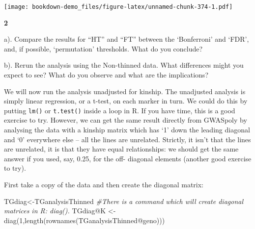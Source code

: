 \documentclass[
]{book}
\makeatletter
\newenvironment{Shaded}{\begin{snugshade}}{\end{snugshade}}
\newcommand{\AttributeTok}[1]{\textcolor[rgb]{0.77,0.63,0.00}{#1}}
\newcommand{\CommentTok}[1]{\textcolor[rgb]{0.56,0.35,0.01}{\textit{#1}}}
\newcommand{\DecValTok}[1]{\textcolor[rgb]{0.00,0.00,0.81}{#1}}
\newcommand{\FunctionTok}[1]{\textcolor[rgb]{0.00,0.00,0.00}{#1}}
\newcommand{\NormalTok}[1]{#1}
\newcommand{\OtherTok}[1]{\textcolor[rgb]{0.56,0.35,0.01}{#1}}
\newcommand{\SpecialCharTok}[1]{\textcolor[rgb]{0.00,0.00,0.00}{#1}}
\newenvironment{kframe}{%
\medskip{}
\setlength{\fboxsep}{.8em}
 \def\at@end@of@kframe{}%
 \ifinner\ifhmode%
  \def\at@end@of@kframe{\end{minipage}}%
  \begin{minipage}{\columnwidth}%
 \fi\fi%
 \def\FrameCommand##1{\hskip\@totalleftmargin \hskip-\fboxsep
 \colorbox{shadecolor}{##1}\hskip-\fboxsep
     \hskip-\linewidth \hskip-\@totalleftmargin \hskip\columnwidth}%
 \MakeFramed {\advance\hsize-\width
   \@totalleftmargin\z@ \linewidth\hsize
   \@setminipage}}%
 {\par\unskip\endMakeFramed%
 \at@end@of@kframe}
\newenvironment{rmdblock}[1]
  {
  \begin{itemize}
  \renewcommand{\labelitemi}{
    \raisebox{-.7\height}[0pt][0pt]{
      {\setkeys{Gin}{width=3em,keepaspectratio}\texttt{[image: images/\#1]}}
    }
  }
  \setlength{\fboxsep}{1em}
  \begin{kframe}
  \item
  }
  {
  \end{kframe}
  \end{itemize}
  }
\newenvironment{rmdquiz}
  {\begin{rmdblock}{quiz}}
  {\end{rmdblock}}
\makeatother
\begin{document}
\begin{Shaded}
\end{Shaded}

\texttt{[image: bookdown-demo\_files/figure-latex/unnamed-chunk-374-1.pdf]}

\begin{rmdquiz}
\textbf{2}

a). Compare the results for ``HT'' and ``FT'' between the `Bonferroni' and `FDR', and, if possible, `permutation' thresholds. What do you conclude?

b). Rerun the analysis using the Non-thinned data. What differences might you expect to see? What do you observe and what are the implications?
\end{rmdquiz}

We will now run the analysis unadjusted for kinship. The unadjusted analysis is simply linear regression, or a t-test, on each marker in turn. We could do this by putting \texttt{lm()} or \texttt{t.test()} inside a loop in R. If you have time, this is a good exercise to try. However, we can get the same result directly from GWASpoly by analysing the data with a kinship matrix which has `1' down the leading diagonal and `0' everywhere else -- all the lines are unrelated. Strictly, it isn't that the lines are unrelated, it is that they have equal relationships: we should get the same answer if you used, say, 0.25, for the off- diagonal elements (another good exercise to try).

First take a copy of the data and then create the diagonal matrix:

\begin{Shaded}
\begin{Highlighting}[]
\NormalTok{TGdiag}\OtherTok{\textless{}{-}}\NormalTok{TGanalysisThinned}
\CommentTok{\#There is a command which will create diagonal matrices in R: diag().  }
\NormalTok{TGdiag}\SpecialCharTok{@}\NormalTok{K }\OtherTok{\textless{}{-}} \FunctionTok{diag}\NormalTok{(}\DecValTok{1}\NormalTok{,}\FunctionTok{length}\NormalTok{(}\FunctionTok{rownames}\NormalTok{(TGanalysisThinned}\SpecialCharTok{@}\NormalTok{geno)))}
\end{Highlighting}
\end{Shaded}
\end{document}
